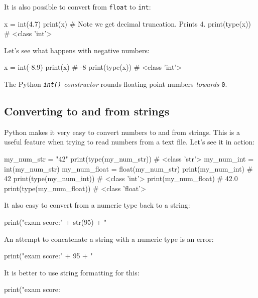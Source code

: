 \documentclass[12pt]{article} \newif\ifsolution\solutiontrue %
\begin{document}
It is also possible to convert from \texttt{float} to \texttt{int}:

\begin{python}
x = int(4.7)
print(x)        # Note we get decimal truncation. Prints 4.
print(type(x))  # <class 'int'>
\end{python}

Let's see what happens with negative numbers:

\begin{python}
x = int(-8.9)
print(x)        # -8
print(type(x))  # <class 'int'>
\end{python}

The Python \emph{\texttt{int()} constructor} rounds floating point numbers
\emph{towards} \texttt{0}.

\subsection{Converting to and from
strings}\label{converting-to-and-from-strings}

Python makes it very easy to convert numbers to and from strings. This
is a useful feature when trying to read numbers from a text file. Let's
see it in action:

\begin{python}
my_num_str = "42"
print(type(my_num_str))           # <class 'str'>
my_num_int = int(my_num_str)
my_num_float = float(my_num_str)
print(my_num_int)                 # 42
print(type(my_num_int))           # <class 'int'>
print(my_num_float)               # 42.0
print(type(my_num_float))         # <class 'float'>
\end{python}

It also easy to convert from a numeric type back to a string:

\begin{python}
print("exam score:" + str(95) + "%
\end{python}

An attempt to concatenate a string with a numeric type is an error:

\begin{python}
print("exam score:" + 95 + "%
\end{python}

It is better to use string formatting for this:

\begin{python}
print("exam score: {}%
\end{python}
\end{document}
